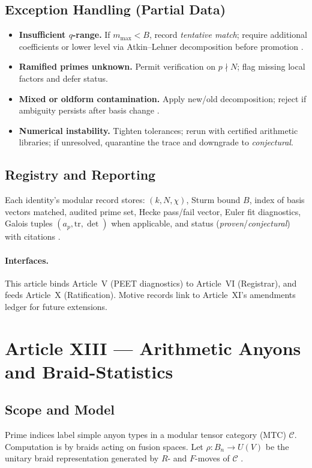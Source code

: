 \documentclass[12pt]{amsart}
\theoremstyle{plain}
\begin{document}
\subsection{Exception Handling (Partial Data)}
\begin{itemize}
  \item \textbf{Insufficient $q$-range.} If $m_{\max}<B$, record \emph{tentative match}; require additional coefficients or lower level via Atkin–Lehner decomposition before promotion \cite{diamond2005first}.
  \item \textbf{Ramified primes unknown.} Permit verification on $p\nmid N$; flag missing local factors and defer status.
  \item \textbf{Mixed or oldform contamination.} Apply new/old decomposition; reject if ambiguity persists after basis change \cite{diamond2005first}.
  \item \textbf{Numerical instability.} Tighten tolerances; rerun with certified arithmetic libraries; if unresolved, quarantine the trace and downgrade to \emph{conjectural}.
\end{itemize}

\subsection{Registry and Reporting}
Each identity’s modular record stores: $(k,N,\chi)$, Sturm bound $B$, index of basis vectors matched, audited prime set, Hecke pass/fail vector, Euler fit diagnostics, Galois tuples $(a_p,\mathrm{tr},\det)$ when applicable, and status (\emph{proven}/\emph{conjectural}) with citations \cite{sturm1987congruence,diamond2005first,deligne1971formes,wiles1995modular,taylor1995ring,langlands1970problems,harris2001geometry}.

\paragraph{Interfaces.}
This article binds Article~V (PEET diagnostics) to Article~VI (Registrar), and feeds Article~X (Ratification). Motive records link to Article~XI’s amendments ledger for future extensions.

\section{Article XIII — Arithmetic Anyons and Braid-Statistics}

\subsection{Scope and Model}
Prime indices label simple anyon types in a modular tensor category (MTC) $\mathcal{C}$.
Computation is by braids acting on fusion spaces.
Let $\rho: B_n \to U(V)$ be the unitary braid representation generated by $R$- and $F$-moves of $\mathcal{C}$ \cite{etingof2015tensor,nayak2008nonabelian,freedman2003topological,kitaev2003fault,pachos2012introduction}.
\end{document}
